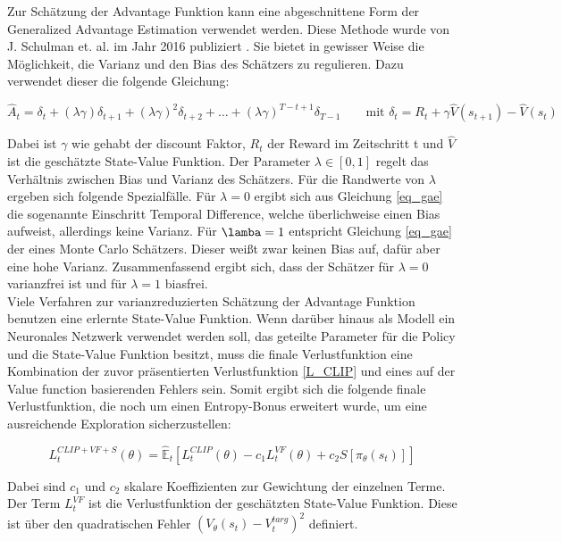 Zur Schätzung der Advantage Funktion kann eine abgeschnittene Form der Generalized Advantage Estimation verwendet werden. Diese Methode wurde von J. Schulman et. al. im Jahr 2016 publiziert \cite{GAE}. Sie bietet in gewisser Weise die Möglichkeit, die Varianz und den Bias des Schätzers zu regulieren. Dazu verwendet dieser die folgende Gleichung:

\begin{equation}
  \hat{A}_t = \delta_t + (\lambda \gamma) \delta_{t+1} + (\lambda \gamma)^2 \delta_{t+2} + \dots + (\lambda \gamma)^{T-t+1} \delta_{T-1} \qquad \text{mit } \delta_t = R_t + \gamma \hat{V}(s_{t+1}) - \hat{V}(s_t)
  \label{eq_gae}
\end{equation}

Dabei ist $\gamma$ wie gehabt der discount Faktor, $R_t$ der Reward im Zeitschritt t und $\hat{V}$ ist die geschätzte State-Value Funktion. Der Parameter $\lambda \in [0, 1]$ regelt das Verhältnis zwischen Bias und Varianz des Schätzers. Für die Randwerte von $\lambda$ ergeben sich folgende Spezialfälle. Für $\lambda = 0$ ergibt sich aus Gleichung \ref{eq_gae} die sogenannte Einschritt Temporal Difference, welche überlichweise einen Bias aufweist, allerdings keine Varianz. Für $\lamba = 1$ entspricht Gleichung \ref{eq_gae} der eines Monte Carlo Schätzers. Dieser weißt zwar keinen Bias auf, dafür aber eine hohe Varianz. Zusammenfassend ergibt sich, dass der Schätzer für $\lambda = 0$ varianzfrei ist und für $\lambda = 1$ biasfrei. \\

Viele Verfahren zur varianzreduzierten Schätzung der Advantage Funktion benutzen eine erlernte State-Value Funktion. Wenn darüber hinaus als Modell ein Neuronales Netzwerk verwendet werden soll, das geteilte Parameter für die Policy und die State-Value Funktion besitzt, muss die finale Verlustfunktion eine Kombination der zuvor präsentierten Verlustfunktion \eqref{L_CLIP} und eines auf der Value function basierenden Fehlers sein. Somit ergibt sich die folgende finale Verlustfunktion, die noch um einen Entropy-Bonus erweitert wurde, um eine ausreichende Exploration sicherzustellen:

\begin{equation}
	L_t^{CLIP+VF+S}(\theta) = \hat{\mathbb{E}}_t[L_t^{CLIP}(\theta) - c_1 L_t^{VF}(\theta) + c_2 S[\pi_\theta(s_t)]]
  \label{L_gesamt}
\end{equation}

Dabei sind $c_1$ und $c_2$ skalare Koeffizienten zur Gewichtung der einzelnen Terme. Der Term $L_t^{VF}$ ist die Verlustfunktion der geschätzten State-Value Funktion. Diese ist über den quadratischen Fehler $(V_\theta(s_t) - V_t^{targ})^2$ definiert.\\

